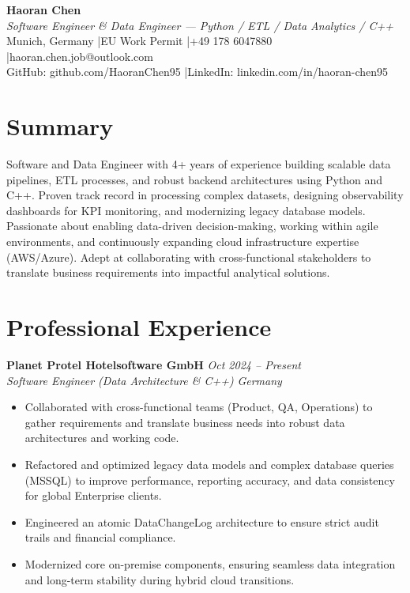 \documentclass[11pt,a4paper]{article}
\newcommand{\resumeItem}[1]{
  \item \small{#1}
}
\newcommand{\resumeSubheading}[4]{
  \textbf{#1} \hfill \textit{#2} \\
  \textit{#3} \hfill \textit{#4}
}
\begin{document}
{\LARGE \textbf{Haoran Chen}} \\[2pt]
\textit{Software Engineer \& Data Engineer — Python / ETL / Data Analytics / C++} \\[4pt]
Munich, Germany \quad|\quad EU Work Permit \quad|\quad +49 178 6047880 \quad|\quad haoran.chen.job@outlook.com \\[2pt]
GitHub: github.com/HaoranChen95 \quad|\quad LinkedIn: linkedin.com/in/haoran-chen95

\vspace{2pt}

\section*{Summary}
Software and Data Engineer with 4+ years of experience building scalable data pipelines, ETL processes, and robust backend architectures using Python and C++. Proven track record in processing complex datasets, designing observability dashboards for KPI monitoring, and modernizing legacy database models. Passionate about enabling data-driven decision-making, working within agile environments, and continuously expanding cloud infrastructure expertise (AWS/Azure). Adept at collaborating with cross-functional stakeholders to translate business requirements into impactful analytical solutions.

\vspace{2pt}

\section*{Professional Experience}

\resumeSubheading{Planet Protel Hotelsoftware GmbH}{Oct 2024 -- Present}{Software Engineer (Data Architecture \& C++)}{Germany}
\begin{itemize}[leftmargin=*, parsep=0pt, itemsep=2pt, topsep=2pt]
  \resumeItem{Collaborated with cross-functional teams (Product, QA, Operations) to gather requirements and translate business needs into robust data architectures and working code.}
  \resumeItem{Refactored and optimized legacy data models and complex database queries (MSSQL) to improve performance, reporting accuracy, and data consistency for global Enterprise clients.}
  \resumeItem{Engineered an atomic DataChangeLog architecture to ensure strict audit trails and financial compliance.}
  \resumeItem{Modernized core on-premise components, ensuring seamless data integration and long-term stability during hybrid cloud transitions.}
\end{itemize}
\end{document}
